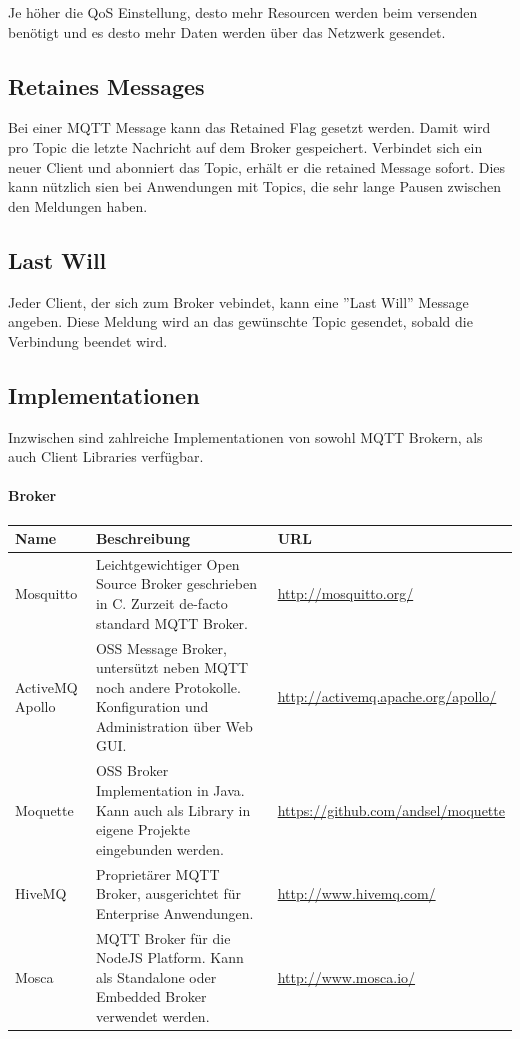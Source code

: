 Je höher die QoS Einstellung, desto mehr Resourcen werden beim versenden benötigt und es desto mehr Daten werden über das Netzwerk gesendet.

\subsection{Retaines Messages} \label{retained}
Bei einer MQTT Message kann das Retained Flag gesetzt werden. Damit wird pro Topic die letzte Nachricht auf dem Broker gespeichert. Verbindet sich ein neuer Client und abonniert das Topic, erhält er die retained Message sofort. Dies kann nützlich sien bei Anwendungen mit Topics, die sehr lange Pausen zwischen den Meldungen haben.

\subsection{Last Will}
Jeder Client, der sich zum Broker vebindet, kann eine ''Last Will'' Message angeben. Diese Meldung wird an das gewünschte Topic gesendet, sobald die Verbindung beendet wird.

\pagebreak

\subsection{Implementationen}
Inzwischen sind zahlreiche Implementationen von sowohl MQTT Brokern, als auch Client Libraries verfügbar.

\paragraph{Broker}

\begin{center}
\begin{tabular}{ | m{5em} | m{25em}| m{12em} | }
 \hline
 Name & Beschreibung & URL \\
 \hline
 Mosquitto  & Leichtgewichtiger Open Source Broker geschrieben in C. Zurzeit de-facto standard MQTT Broker. & \url{http://mosquitto.org/}  \\
 \hline
 ActiveMQ Apollo   & OSS Message Broker, untersützt neben MQTT noch andere Protokolle. Konfiguration und Administration über Web GUI. & \url{http://activemq.apache.org/apollo/}  \\
  \hline
 Moquette  & OSS Broker Implementation in Java. Kann auch als Library in eigene Projekte eingebunden werden. & \url{https://github.com/andsel/moquette}  \\
 \hline
  HiveMQ  & Proprietärer MQTT Broker, ausgerichtet für Enterprise Anwendungen.  & \url{http://www.hivemq.com/}  \\
 \hline
  Mosca  & MQTT Broker für die NodeJS Platform. Kann als Standalone oder Embedded Broker verwendet werden.  & \url{http://www.mosca.io/}  \\
\hline

\end{tabular}
\end{center}



